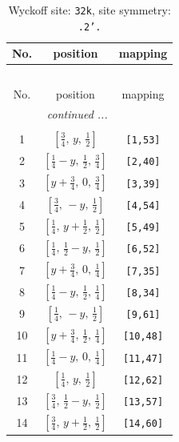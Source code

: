 \documentclass[fleqn,8pt]{jsarticle}
\begin{document}
\begin{longtable}{ccc}
\caption{Wyckoff site: {\tt 32k}, site symmetry: {\tt .2'.}}
 \\
 \hline \hline
No. & position & mapping \\ \hline \endfirsthead

\multicolumn{2}{l}{\tablename\ \thetable{}} \\
 \hline \hline
No. & position & mapping \\ \hline \endhead

 \hline \hline
\multicolumn{2}{r}{\footnotesize\it continued ...} \\ \endfoot

 \hline \hline
\multicolumn{2}{r}{} \\ \endlastfoot

1 & $\left[ \frac{3}{4},\, y,\, \frac{1}{2} \right]$ & {\tt [1,53]} \\ \hline
2 & $\left[ \frac{1}{4} - y,\, \frac{1}{2},\, \frac{3}{4} \right]$ & {\tt [2,40]} \\ \hline
3 & $\left[ y + \frac{3}{4},\, 0,\, \frac{3}{4} \right]$ & {\tt [3,39]} \\ \hline
4 & $\left[ \frac{3}{4},\, - y,\, \frac{1}{2} \right]$ & {\tt [4,54]} \\ \hline
5 & $\left[ \frac{1}{4},\, y + \frac{1}{2},\, \frac{1}{2} \right]$ & {\tt [5,49]} \\ \hline
6 & $\left[ \frac{1}{4},\, \frac{1}{2} - y,\, \frac{1}{2} \right]$ & {\tt [6,52]} \\ \hline
7 & $\left[ y + \frac{3}{4},\, 0,\, \frac{1}{4} \right]$ & {\tt [7,35]} \\ \hline
8 & $\left[ \frac{1}{4} - y,\, \frac{1}{2},\, \frac{1}{4} \right]$ & {\tt [8,34]} \\ \hline
9 & $\left[ \frac{1}{4},\, - y,\, \frac{1}{2} \right]$ & {\tt [9,61]} \\ \hline
10 & $\left[ y + \frac{3}{4},\, \frac{1}{2},\, \frac{1}{4} \right]$ & {\tt [10,48]} \\ \hline
11 & $\left[ \frac{1}{4} - y,\, 0,\, \frac{1}{4} \right]$ & {\tt [11,47]} \\ \hline
12 & $\left[ \frac{1}{4},\, y,\, \frac{1}{2} \right]$ & {\tt [12,62]} \\ \hline
13 & $\left[ \frac{3}{4},\, \frac{1}{2} - y,\, \frac{1}{2} \right]$ & {\tt [13,57]} \\ \hline
14 & $\left[ \frac{3}{4},\, y + \frac{1}{2},\, \frac{1}{2} \right]$ & {\tt [14,60]} \\ \hline

\end{longtable}
\end{document}
